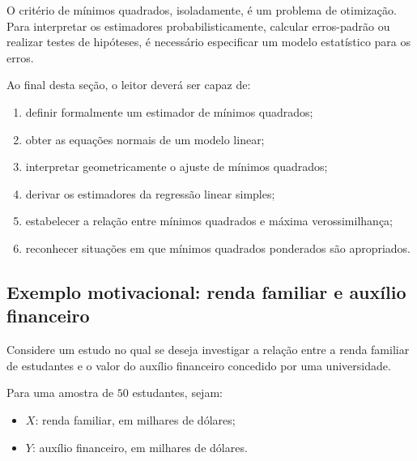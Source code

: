 \documentclass[
  letterpaper,
  DIV=11,
  numbers=noendperiod]{scrreprt}
\providecommand{\tightlist}{%
  \setlength{\itemsep}{0pt}\setlength{\parskip}{0pt}}\usepackage{longtable,booktabs,array}
\begin{document}
\begin{tcolorbox}[enhanced jigsaw, colback=white, leftrule=.75mm, colbacktitle=quarto-callout-note-color!10!white, breakable, titlerule=0mm, bottomtitle=1mm, title=\textcolor{quarto-callout-note-color}{\faInfo}\hspace{0.5em}{Observação}, colframe=quarto-callout-note-color-frame, toprule=.15mm, opacityback=0, bottomrule=.15mm, opacitybacktitle=0.6, arc=.35mm, toptitle=1mm, rightrule=.15mm, coltitle=black, left=2mm]

O critério de mínimos quadrados, isoladamente, é um problema de
otimização. Para interpretar os estimadores probabilisticamente,
calcular erros-padrão ou realizar testes de hipóteses, é necessário
especificar um modelo estatístico para os erros.

\end{tcolorbox}

Ao final desta seção, o leitor deverá ser capaz de:

\begin{enumerate}
\def\labelenumi{\arabic{enumi}.}
\tightlist
\item
  definir formalmente um estimador de mínimos quadrados;
\item
  obter as equações normais de um modelo linear;
\item
  interpretar geometricamente o ajuste de mínimos quadrados;
\item
  derivar os estimadores da regressão linear simples;
\item
  estabelecer a relação entre mínimos quadrados e máxima
  verossimilhança;
\item
  reconhecer situações em que mínimos quadrados ponderados são
  apropriados.
\end{enumerate}

\subsection{Exemplo motivacional: renda familiar e auxílio
financeiro}\label{exemplo-motivacional-renda-familiar-e-auxuxedlio-financeiro}

Considere um estudo no qual se deseja investigar a relação entre a renda
familiar de estudantes e o valor do auxílio financeiro concedido por uma
universidade.

Para uma amostra de \(50\) estudantes, sejam:

\begin{itemize}
\tightlist
\item
  \(X\): renda familiar, em milhares de dólares;
\item
  \(Y\): auxílio financeiro, em milhares de dólares.
\end{itemize}
\end{document}
